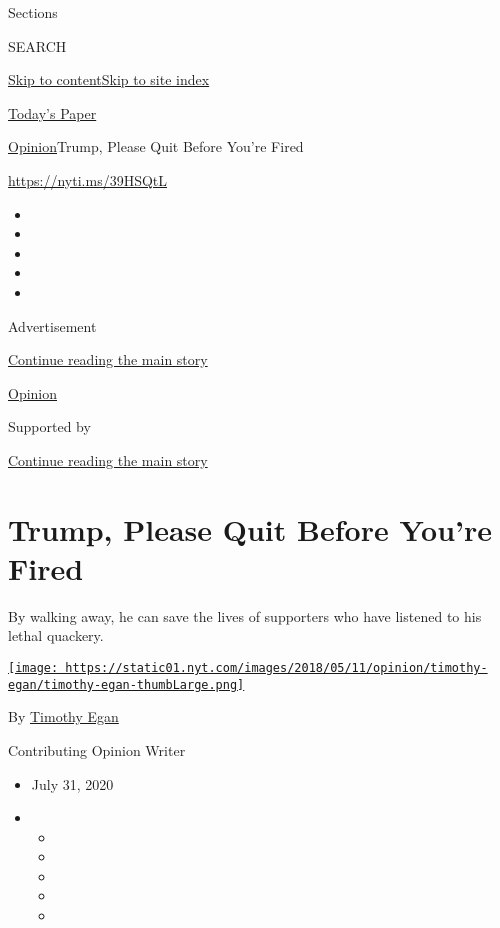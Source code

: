 Sections

SEARCH

\protect\hyperlink{site-content}{Skip to
content}\protect\hyperlink{site-index}{Skip to site index}

\href{https://myaccount.nytimes.com/auth/login?response_type=cookie\&client_id=vi}{}

\href{https://www.nytimes.com/section/todayspaper}{Today's Paper}

\href{/section/opinion}{Opinion}\textbar{}Trump, Please Quit Before
You're Fired

\url{https://nyti.ms/39HSQtL}

\begin{itemize}
\item
\item
\item
\item
\item
\end{itemize}

Advertisement

\protect\hyperlink{after-top}{Continue reading the main story}

\href{/section/opinion}{Opinion}

Supported by

\protect\hyperlink{after-sponsor}{Continue reading the main story}

\hypertarget{trump-please-quit-before-youre-fired}{%
\section{Trump, Please Quit Before You're
Fired}\label{trump-please-quit-before-youre-fired}}

By walking away, he can save the lives of supporters who have listened
to his lethal quackery.

\href{https://www.nytimes.com/by/timothy-egan}{\texttt{[image: https://static01.nyt.com/images/2018/05/11/opinion/timothy-egan/timothy-egan-thumbLarge.png]}}

By \href{https://www.nytimes.com/by/timothy-egan}{Timothy Egan}

Contributing Opinion Writer

\begin{itemize}
\item
  July 31, 2020
\item
  \begin{itemize}
  \item
  \item
  \item
  \item
  \item
  \end{itemize}
\end{itemize}

